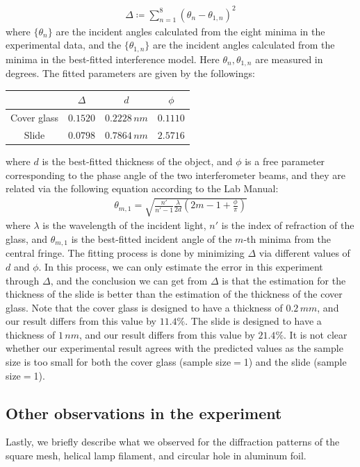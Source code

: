\documentclass[11pt]{book}
\theoremstyle{break}
\theoremstyle{break}
\begin{document}
\begin{align*}
\Delta \coloneqq \sum_{n=1}^{8}(\theta_n - \theta_{1,n})^2
\end{align*}
where $\{\theta_n\}$ are the incident angles calculated from the eight minima in the experimental data, and the $\{\theta_{1,n}\}$ are the incident angles calculated from the minima in the best-fitted interference model. Here $\theta_n, \theta_{1,n}$ are measured in degrees. The fitted parameters are given by the followings:
\begin{center}
\begin{tabular}{|c|c|c|c|}
\hline 
 & $\Delta$ & $d$ & $\phi$\\
\hline
Cover glass & $0.1520$ & $0.2228\, nm$ & $0.1110$\\
\hline
Slide & $0.0798$ & $0.7864\, nm$ & $2.5716$\\
\hline
\end{tabular}
\end{center}
where $d$ is the best-fitted thickness of the object, and $\phi$ is a free parameter corresponding to the phase angle of the two interferometer beams, and they are related via the following equation according to the Lab Manual:
\begin{align*}
\theta_{m,1}=\sqrt{\frac{n'}{n'-1}\frac{\lambda}{2d} \left( 2m-1 +\frac{\phi}{\pi}\right)}
\end{align*}
where $\lambda$ is the wavelength of the incident light, $n'$ is the index of refraction of the glass, and $\theta_{m,1}$ is the best-fitted incident angle of the $m$-th minima from the central fringe. The fitting process is done by minimizing $\Delta$ via different values of $d$ and $\phi$. In this process, we can only estimate the error in this experiment through $\Delta$, and the conclusion we can get from $\Delta$ is that the estimation for the thickness of the slide is better than the estimation of the thickness of the cover glass. Note that the cover glass is designed to have a thickness of $0.2 \, mm$, and our result differs from this value by $11.4\%$. The slide is designed to have a thickness of $1\, nm$, and our result differs from this value by $21.4\%$. It is not clear whether our experimental result agrees with the predicted values as the sample size is too small for both the cover glass (sample size$=$1) and the slide (sample size$=$1). \\


\subsection{Other observations in the experiment}
Lastly, we briefly describe what we observed for the diffraction patterns of the square mesh, helical lamp filament, and circular hole in aluminum foil.\\
\end{document}
